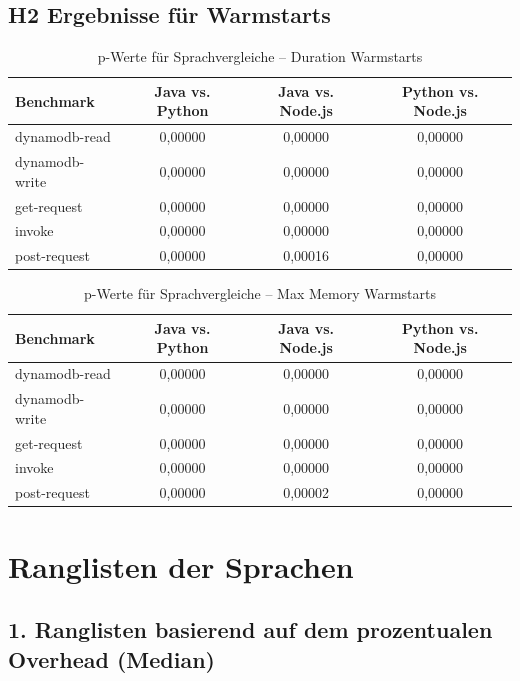 \subsection{H2 Ergebnisse für Warmstarts}
\label{boot:res:hot}

\begin{table}[H]
\centering
\footnotesize
\caption{p-Werte für Sprachvergleiche – Duration Warmstarts}
\label{app:boot-h2-hot-duration}
\begin{tabular}{|l|c|c|c|}
\hline
\textbf{Benchmark} & \textbf{Java vs. Python} & \textbf{Java vs. Node.js} & \textbf{Python vs. Node.js} \\
\hline
dynamodb-read   & 0,00000 & 0,00000 & 0,00000 \\
dynamodb-write  & 0,00000 & 0,00000 & 0,00000 \\
get-request     & 0,00000 & 0,00000 & 0,00000 \\
invoke          & 0,00000 & 0,00000 & 0,00000 \\
post-request    & 0,00000 & 0,00016 & 0,00000 \\
\hline
\end{tabular}
\end{table}

\begin{table}[H]
\centering
\footnotesize
\caption{p-Werte für Sprachvergleiche – Max Memory Warmstarts}
\label{app:boot-h2-hot-memory}
\begin{tabular}{|l|c|c|c|}
\hline
\textbf{Benchmark} & \textbf{Java vs. Python} & \textbf{Java vs. Node.js} & \textbf{Python vs. Node.js} \\
\hline
dynamodb-read   & 0,00000 & 0,00000 & 0,00000 \\
dynamodb-write  & 0,00000 & 0,00000 & 0,00000 \\
get-request     & 0,00000 & 0,00000 & 0,00000 \\
invoke          & 0,00000 & 0,00000 & 0,00000 \\
post-request    & 0,00000 & 0,00002 & 0,00000 \\
\hline
\end{tabular}
\end{table}

\section{Ranglisten der Sprachen}
\label{app:rankings}
\subsection*{1. Ranglisten basierend auf dem prozentualen Overhead (Median)}

